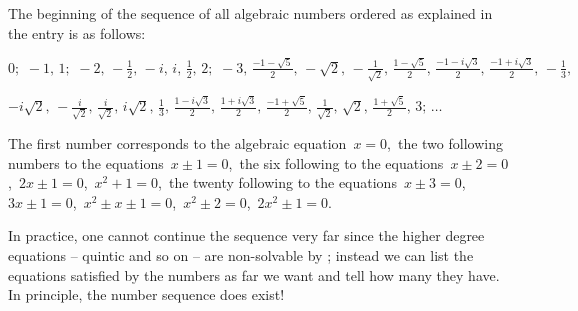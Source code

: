\documentclass[12pt]{article}
\theoremstyle{definition}
\begin{document}
The beginning of the sequence of all algebraic numbers ordered as explained in the  entry is as follows:

$0;\,\,-1,\,1;\,\,-2,\,-\frac{1}{2},\,-i,\,i,\,\frac{1}{2},\,2;\,\,-3,\,
\frac{-1-\sqrt{5}}{2},\,-\sqrt{2},\,
-\frac{1}{\sqrt{2}},\,\frac{1-\sqrt{5}}{2},\,\frac{-1-i\sqrt{3}}{2},
\,\frac{-1+i\sqrt{3}}{2},\,-\frac{1}{3},\,$

$-i\sqrt{2},\,-\frac{i}{\sqrt{2}},\,\frac{i}{\sqrt{2}},\,
i\sqrt{2},\,\frac{1}{3},\,\frac{1-i\sqrt{3}}{2},\,
\frac{1+i\sqrt{3}}{2},\,\frac{-1+\sqrt{5}}{2},\,\frac{1}{\sqrt{2}},\,\sqrt{2},\,
\frac{1+\sqrt{5}}{2},\,3;\,\ldots$

The first number corresponds to the algebraic equation \,$x = 0$,\, the two following numbers to the equations \,$x\pm 1 =0$,\, the six following to the equations \,$x\pm 2 = 0$,\, $2x\pm 1 = 0$,\, $x^2+1 = 0$,\, the twenty following to the equations \,$x\pm 3 = 0$,\, $3x\pm 1 = 0$,\, $x^2\pm x \pm 1 = 0$,\, $x^2\pm 2 = 0$,\, $2x^2\pm 1 = 0$.

In practice, one cannot continue the sequence very far since the higher degree equations -- quintic and so on -- are non-solvable by ; instead we can list the equations satisfied by the numbers as far we want and tell how many  they have. \,In principle, the number sequence does exist!
\end{document}
